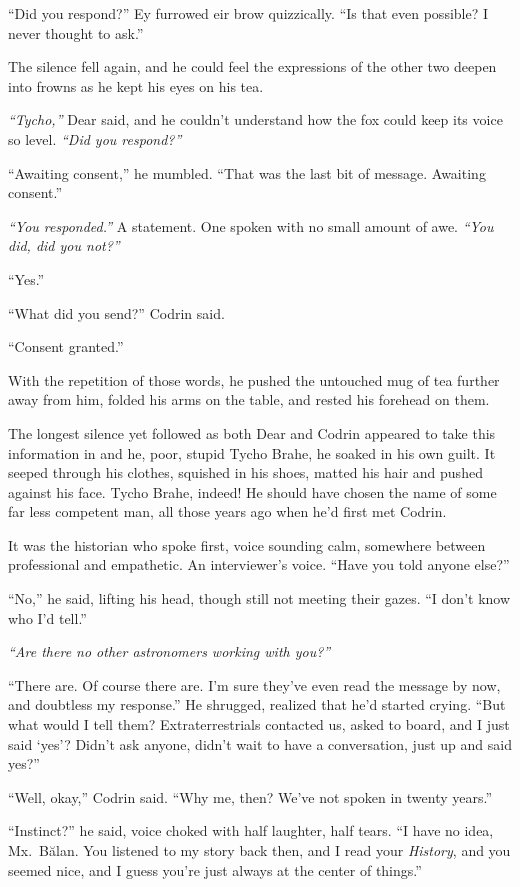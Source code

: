 ``Did you respond?'' Ey furrowed eir brow quizzically. ``Is that even possible? I never thought to ask.''

The silence fell again, and he could feel the expressions of the other two deepen into frowns as he kept his eyes on his tea.

\emph{``Tycho,''} Dear said, and he couldn't understand how the fox could keep its voice so level. \emph{``Did you respond?''}

``Awaiting consent,'' he mumbled. ``That was the last bit of message. Awaiting consent.''

\emph{``You responded.''} A statement. One spoken with no small amount of awe. \emph{``You did, did you not?''}

``Yes.''

``What did you send?'' Codrin said.

``Consent granted.''

With the repetition of those words, he pushed the untouched mug of tea further away from him, folded his arms on the table, and rested his forehead on them.

The longest silence yet followed as both Dear and Codrin appeared to take this information in and he, poor, stupid Tycho Brahe, he soaked in his own guilt. It seeped through his clothes, squished in his shoes, matted his hair and pushed against his face. Tycho Brahe, indeed! He should have chosen the name of some far less competent man, all those years ago when he'd first met Codrin.

It was the historian who spoke first, voice sounding calm, somewhere between professional and empathetic. An interviewer's voice. ``Have you told anyone else?''

``No,'' he said, lifting his head, though still not meeting their gazes. ``I don't know who I'd tell.''

\emph{``Are there no other astronomers working with you?''}

``There are. Of course there are. I'm sure they've even read the message by now, and doubtless my response.'' He shrugged, realized that he'd started crying. ``But what would I tell them? Extraterrestrials contacted us, asked to board, and I just said `yes'? Didn't ask anyone, didn't wait to have a conversation, just up and said yes?''

``Well, okay,'' Codrin said. ``Why me, then? We've not spoken in twenty years.''

``Instinct?'' he said, voice choked with half laughter, half tears. ``I have no idea, Mx.~Bălan. You listened to my story back then, and I read your \emph{History}, and you seemed nice, and I guess you're just always at the center of things.''


